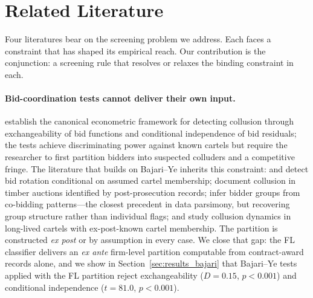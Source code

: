 \section{Related Literature}
\label{sec:literature}

Four literatures bear on the screening problem we address. Each
faces a constraint that has shaped its empirical reach. Our
contribution is the conjunction: a screening rule that resolves
or relaxes the binding constraint in each.

\paragraph{Bid-coordination tests cannot deliver their own
input.} \citet{bajari2003deciding} establish the canonical
econometric framework for detecting collusion through
exchangeability of bid functions and conditional independence of
bid residuals; the tests achieve discriminating power against
known cartels but require the researcher to first partition
bidders into suspected colluders and a competitive fringe. The
literature that builds on Bajari--Ye inherits this constraint:
\citet{porter1993detection} and \citet{porter1999ohio} detect bid
rotation conditional on assumed cartel membership;
\citet{baldwin1997bidder} document collusion in timber auctions
identified by post-prosecution records;
\citet{conley2016detecting} infer bidder groups from co-bidding
patterns---the closest precedent in data parsimony, but
recovering group structure rather than individual flags;
\citet{clark2021collusion} and \citet{schurter2020identification}
study collusion dynamics in long-lived cartels with
ex-post-known cartel membership. The partition is constructed
\emph{ex post} or by assumption in every case. We close that
gap: the FL classifier delivers an \emph{ex ante} firm-level
partition computable from contract-award records alone, and we
show in Section~\ref{sec:results_bajari} that Bajari--Ye tests
applied with the FL partition reject exchangeability
($D = 0.15$, $p < 0.001$) and conditional independence
($t = 81.0$, $p < 0.001$).

